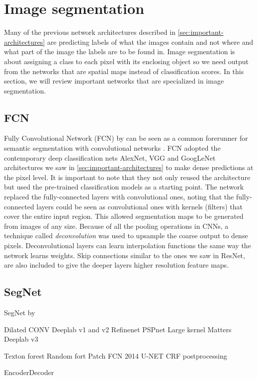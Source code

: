 \section{Image segmentation}
Many of the previous network architectures described in \autoref{sec:important-architectures} are predicting labels of what the images contain and not where and what part of the image the labels are to be found in. Image segmentation is about assigning a class to each pixel with its enclosing object so we need output from the networks that are spatial maps instead of classification scores. In this section, we will review important networks that are specialized in image segmentation.


\subsection{FCN}
Fully Convolutional Network (FCN) by \citeauthor{Long2014} \cite{Long2014} can be seen as a common forerunner for semantic segmentation with convolutional networks \cite{Garcia-Garcia2017}. FCN adopted the contemporary deep classification nets AlexNet, VGG and GoogLeNet architectures we saw in \autoref{sec:important-architectures} to make dense predictions at the pixel level. It is important to note that they not only reused the architecture but used the pre-trained classification models as a starting point. The network replaced the fully-connected layers with convolutional ones, noting that the fully-connected layers could be seen as convolutional ones with kernels (filters) that cover the entire input region. This allowed segmentation maps to be generated from images of any size. Because of all the pooling operations in CNNs, a technique called \emph{deconvolution} \cite{Zeiler2011} was used to upsample the coarse output to dense pixels. Deconvolutional layers can learn interpolation functions the same way the network learns weights. Skip connections similar to the ones we saw in ResNet, are also included to give the deeper layers higher resolution feature maps. 


\subsection{SegNet}
SegNet by \citeauthor{Badrinarayanan2015} \cite{Badrinarayanan2015}




Dilated CONV
Deeplab v1 and v2
Refinenet
PSPnet
Large kernel Matters
Deeplab v3

 Texton forest 
 Random fort
 Patch
 FCN 2014
 U-NET
 CRF postprocessing
 

 
 EncoderDecoder